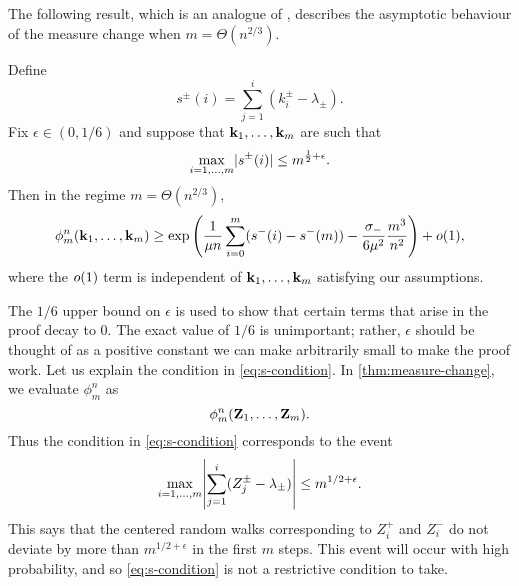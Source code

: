 The following result, which is an analogue of \cite[Lemma 6.7]{conchon--kerjanStableGraphMetric2020}, describes the asymptotic behaviour of the measure change when $m = \Theta(n^{2/3})$.
\begin{lemma}
    \label{lem:measure-change-approx}
    Define
    \begin{equation*}
        s^{\pm}(i) = \textstyle{\sum_{j=1}^i (k_i^{\pm} - \lambda_{\pm})}.
    \end{equation*}
    Fix $\epsilon \in (0, 1/6)$ and suppose that ${\mathbf k}_1, \ldots, {\mathbf k}_m$ are such that
    \begin{equation}
        \label{eq:s-condition}
        \max_{i=1, \ldots, m} \lvert s^{\pm}(i)\rvert \leq m^{\frac{1}{2} + \epsilon}.
    \end{equation}
    Then in the regime $m = \Theta(n^{2/3})$,
    \begin{equation*}
        \phi^n_m({\mathbf k}_1, \ldots, {\mathbf k}_m)
        \geq \exp\left( \frac{1}{\mu n} \sum_{i=0}^m (s^-(i) - s^-(m)) - \frac{\sigma_-}{6 \mu^2} \frac{m^3}{n^2} \right) + o(1),
    \end{equation*}
    where the $o(1)$ term is independent of ${\mathbf k}_1, \ldots, {\mathbf k}_m$ satisfying our assumptions.
\end{lemma}
The $1/6$ upper bound on $\epsilon$ is used to show that certain terms that arise in the proof decay to 0. The exact value of $1/6$ is unimportant; rather, $\epsilon$ should be thought of as a positive constant we can make arbitrarily small to make the proof work. Let us explain the condition in \cref{eq:s-condition}. In \cref{thm:measure-change}, we evaluate $\phi^n_m$ as 
\begin{equation*}
    \phi^n_m({\mathbf Z}_1, \ldots, {\mathbf Z}_m).
\end{equation*}
Thus the condition in \cref{eq:s-condition} corresponds to the event
\begin{equation*}
    \max_{i=1, \ldots, m } \abs*{
        \sum_{j=1}^i (Z^{\pm}_j - \lambda_{\pm}) 
    } \leq m^{1/2 + \epsilon}.
\end{equation*}
This says that the centered random walks corresponding to $Z^+_i$ and $Z^-_i$ do not deviate by more than $m^{1/2 + \epsilon}$ in the first $m$ steps. This event will occur with high probability, and so \cref{eq:s-condition} is not a restrictive condition to take.

